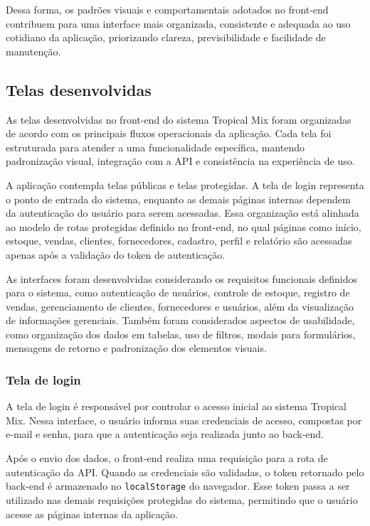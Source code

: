 Dessa forma, os padrões visuais e comportamentais adotados no front-end contribuem para uma interface mais organizada, consistente e adequada ao uso cotidiano da aplicação, priorizando clareza, previsibilidade e facilidade de manutenção.

\subsection{Telas desenvolvidas}

As telas desenvolvidas no front-end do sistema Tropical Mix foram organizadas de acordo com os principais fluxos operacionais da aplicação. Cada tela foi estruturada para atender a uma funcionalidade específica, mantendo padronização visual, integração com a API e consistência na experiência de uso.

A aplicação contempla telas públicas e telas protegidas. A tela de login representa o ponto de entrada do sistema, enquanto as demais páginas internas dependem da autenticação do usuário para serem acessadas. Essa organização está alinhada ao modelo de rotas protegidas definido no front-end, no qual páginas como início, estoque, vendas, clientes, fornecedores, cadastro, perfil e relatório são acessadas apenas após a validação do token de autenticação.

As interfaces foram desenvolvidas considerando os requisitos funcionais definidos para o sistema, como autenticação de usuários, controle de estoque, registro de vendas, gerenciamento de clientes, fornecedores e usuários, além da visualização de informações gerenciais. Também foram considerados aspectos de usabilidade, como organização dos dados em tabelas, uso de filtros, modais para formulários, mensagens de retorno e padronização dos elementos visuais.

\subsubsection{Tela de login}

A tela de login é responsável por controlar o acesso inicial ao sistema Tropical Mix. Nessa interface, o usuário informa suas credenciais de acesso, compostas por e-mail e senha, para que a autenticação seja realizada junto ao back-end.

Após o envio dos dados, o front-end realiza uma requisição para a rota de autenticação da API. Quando as credenciais são validadas, o token retornado pelo back-end é armazenado no \texttt{localStorage} do navegador. Esse token passa a ser utilizado nas demais requisições protegidas do sistema, permitindo que o usuário acesse as páginas internas da aplicação.

